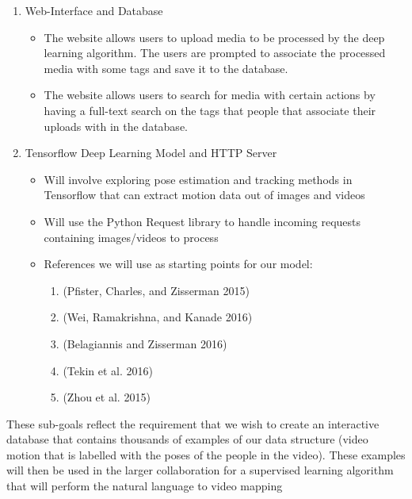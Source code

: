 \documentclass[a4paper, 12pt]{article}
\begin{document}
\begin{enumerate}
        \item Web-Interface and Database
        \begin{itemize}
                \item The website allows users to upload media to be processed
                        by the deep learning algorithm. The users are prompted to
                        associate the processed media with some tags and save it to the
                        database.
                \item The website allows users to search for media with certain
                        actions by having a full-text search on the tags that
                        people that associate their uploads with in the
                        database.
        \end{itemize}

    \item Tensorflow Deep Learning Model and HTTP Server
        \begin{itemize}
                \item Will involve exploring pose estimation and tracking
                        methods in Tensorflow that can extract motion data out of
                        images and videos
                \item Will use the Python Request library to handle
                incoming requests containing images/videos to process
                \item References we will use as starting points for our model:
                \begin{enumerate}[i]
                        \item (Pfister, Charles, and Zisserman 2015)
                        \item (Wei, Ramakrishna, and Kanade 2016)
                        \item (Belagiannis and Zisserman 2016)
                        \item (Tekin et al. 2016)
                        \item (Zhou et al.  2015)
                \end{enumerate}
        \end{itemize}
\end{enumerate}

These sub-goals reflect the requirement that we wish to create an interactive
database that contains thousands of examples of our data structure (video motion
that is labelled with the poses of the people in the video). These examples will
then be used in the larger collaboration for a supervised learning algorithm
that will perform the natural language to video mapping
\end{document}
